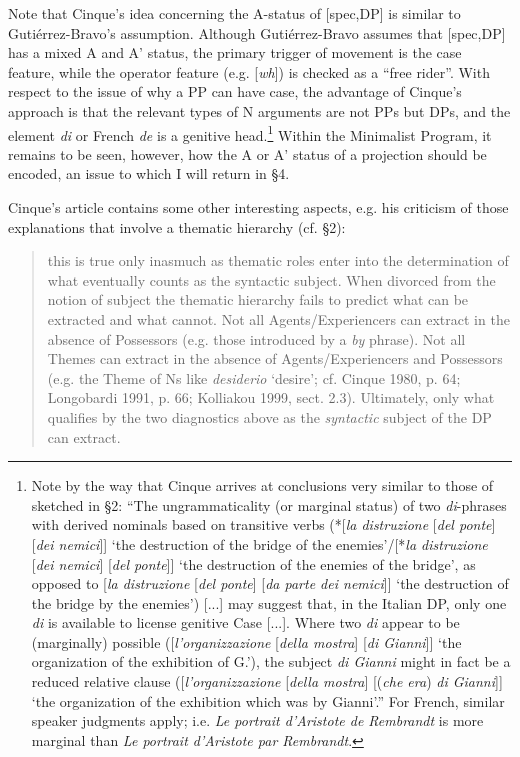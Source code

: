 \documentclass[output=paper]{langsci/langscibook}
\begin{document}
Note that Cinque’s idea concerning the A-status of [spec,DP] is similar to Gutiérrez-Bravo’s assumption. Although Gutiérrez-Bravo assumes that [spec,DP] has a mixed A and A’ status, the primary trigger of movement is the case feature, while the operator feature (e.g. [\textit{wh}]) is checked as a “free rider”. With respect to the issue of why a PP can have case, the advantage of Cinque’s approach is that the relevant types of N arguments are not PPs but DPs, and the element \textit{di} or French \textit{de} is a genitive head.\footnote{Note by the way that Cinque arrives at conclusions very similar to those of \citet{Kolliakou1999} sketched in §2: “The ungrammaticality (or marginal status) of two \textit{di}{}-phrases with derived nominals based on transitive verbs (*[\textit{la distruzione} [\textit{del ponte}] [\textit{dei nemici}]] ‘the destruction of the bridge of the enemies’/[*\textit{la distruzione} [\textit{dei nemici}] [\textit{del ponte}]] ‘the destruction of the enemies of the bridge’, as opposed to [\textit{la distruzione} [\textit{del ponte}] [\textit{da parte dei nemici}]] ‘the destruction of the bridge by the enemies’) [...] may suggest that, in the Italian DP, only one \textit{di} is available to license genitive Case [...]. Where two \textit{di} appear to be (marginally) possible ([\textit{l’organizzazione} [\textit{della mostra}] [\textit{di Gianni}]] ‘the organization of the exhibition of G.’), the subject \textit{di Gianni} might in fact be a reduced relative clause ([\textit{l’organizzazione} [\textit{della mostra}] [(\textit{che era}) \textit{di Gianni}]] ‘the organization of the exhibition which was by Gianni’.” For French, similar speaker judgments apply; i.e. \textit{Le portrait d’Aristote de Rembrandt} is more marginal than \textit{Le portrait d’Aristote par Rembrandt}.} Within the Minimalist Program, it remains to be seen, however, how the A or A’ status of a projection should be encoded, an issue to which I will return in §4.

Cinque’s article contains some other interesting aspects, e.g. his criticism of those explanations that involve a thematic hierarchy (cf. §2):

\begin{quote}\relax [...] this is true only inasmuch as thematic roles enter into the determination of what eventually counts as the syntactic subject. When divorced from the notion of subject the thematic hierarchy fails to predict what can be extracted and what cannot. Not all Agents/Experiencers can extract in the absence of Possessors (e.g. those introduced by a \textit{by} phrase). Not all Themes can extract in the absence of Agents/Experiencers and Possessors (e.g. the Theme of Ns like \textit{desiderio} ‘desire’; cf. Cinque 1980, p. 64; Longobardi 1991, p. 66; Kolliakou 1999, sect. 2.3). Ultimately, only what qualifies by the two diagnostics above as the \textit{syntactic} subject of the DP can extract.\\\hbox{}\hfill{\citep[95–96, Footnote 1]{Cinque2014}}\end{quote}
\end{document}
